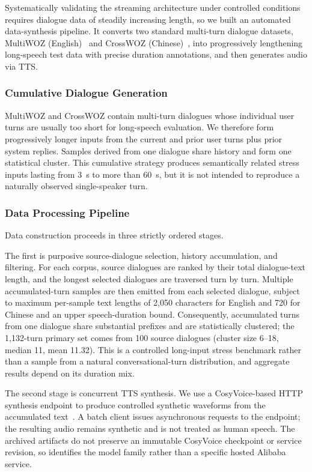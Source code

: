 \documentclass[conference]{IEEEtran}
\begin{document}
Systematically validating the streaming architecture under controlled conditions requires dialogue data of steadily increasing length, so we built an automated data-synthesis pipeline. It converts two standard multi-turn dialogue datasets, MultiWOZ (English)~\cite{ref14} and CrossWOZ (Chinese)~\cite{ref15}, into progressively lengthening long-speech test data with precise duration annotations, and then generates audio via TTS.

\subsubsection{Cumulative Dialogue Generation}

MultiWOZ and CrossWOZ contain multi-turn dialogues whose individual user turns are usually too short for long-speech evaluation. We therefore form progressively longer inputs from the current and prior user turns plus prior system replies. Samples derived from one dialogue share history and form one statistical cluster. This cumulative strategy produces semantically related stress inputs lasting from 3~s to more than 60~s, but it is not intended to reproduce a naturally observed single-speaker turn.

\subsubsection{Data Processing Pipeline}

Data construction proceeds in three strictly ordered stages.

The first is purposive source-dialogue selection, history accumulation, and filtering. For each corpus, source dialogues are ranked by their total dialogue-text length, and the longest selected dialogues are traversed turn by turn. Multiple accumulated-turn samples are then emitted from each selected dialogue, subject to maximum per-sample text lengths of 2,050 characters for English and 720 for Chinese and an upper speech-duration bound. Consequently, accumulated turns from one dialogue share substantial prefixes and are statistically clustered; the 1,132-turn primary set comes from 100 source dialogues (cluster size 6--18, median 11, mean 11.32). This is a controlled long-input stress benchmark rather than a sample from a natural conversational-turn distribution, and aggregate results depend on its duration mix.

The second stage is concurrent TTS synthesis. We use a CosyVoice-based HTTP synthesis endpoint to produce controlled synthetic waveforms from the accumulated text~\cite{ref17}. A batch client issues asynchronous requests to the endpoint; the resulting audio remains synthetic and is not treated as human speech. The archived artifacts do not preserve an immutable CosyVoice checkpoint or service revision, so \cite{ref17} identifies the model family rather than a specific hosted Alibaba service.
\end{document}
